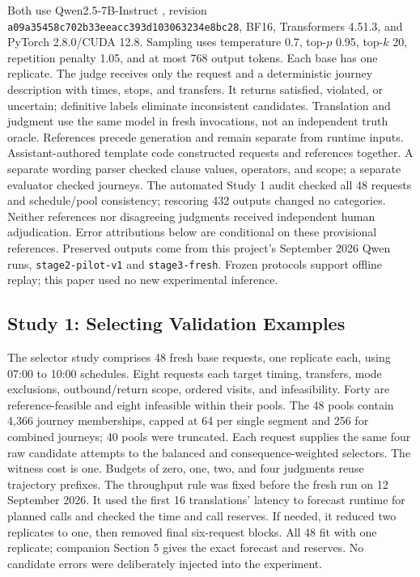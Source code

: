 \documentclass[a4paper,twoside]{article}
\begin{document}
Both use Qwen2.5-7B-Instruct \cite{qwen}, revision \texttt{a09a35458c702b33eeac\allowbreak{}c393d103063234e8bc28}, BF16, Transformers 4.51.3, and PyTorch 2.8.0/CUDA 12.8. Sampling uses temperature 0.7, top-$p$ 0.95, top-$k$ 20, repetition penalty 1.05, and at most 768 output tokens. Each base has one replicate.
The judge receives only the request and a deterministic journey description with times, stops, and transfers. It returns satisfied, violated, or uncertain; definitive labels eliminate inconsistent candidates. Translation and judgment use the same model in fresh invocations, not an independent truth oracle. 
References precede generation and remain separate from runtime inputs. Assistant-authored template code constructed requests and references together. A separate wording parser checked clause values, operators, and scope; a separate evaluator checked journeys. The automated Study 1 audit checked all 48 requests and schedule/pool consistency; rescoring 432 outputs changed no categories. Neither references nor disagreeing judgments received independent human adjudication. Error attributions below are conditional on these provisional references.
Preserved outputs come from this project's September 2026 Qwen runs, \texttt{stage2-pilot-v1} and \texttt{stage3-fresh}. Frozen protocols support offline replay; this paper used no new experimental inference.

\subsection{Study 1: Selecting Validation Examples}

The selector study comprises 48 fresh base requests, one replicate each, using 07:00 to 10:00 schedules. Eight requests each target timing, transfers, mode exclusions, outbound/return scope, ordered visits, and infeasibility. Forty are reference-feasible and eight infeasible within their pools. The 48 pools contain 4,366 journey memberships, capped at 64 per single segment and 256 for combined journeys; 40 pools were truncated.
Each request supplies the same four raw candidate attempts to the balanced and consequence-weighted selectors. The witness cost is one. Budgets of zero, one, two, and four judgments reuse trajectory prefixes. The throughput rule was fixed before the fresh run on 12 September 2026. It used the first 16 translations' latency to forecast runtime for planned calls and checked the time and call reserves. If needed, it reduced two replicates to one, then removed final six-request blocks. All 48 fit with one replicate; companion Section 5 gives the exact forecast and reserves. No candidate errors were deliberately injected into the experiment.
\end{document}
